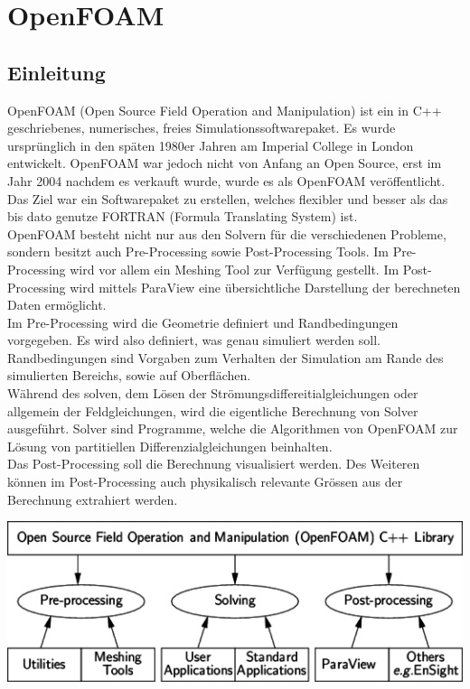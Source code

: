 
\chapter{OpenFOAM}
\begin{refsection}

\newpage
\section{Einleitung}
OpenFOAM (Open Source Field Operation and Manipulation) ist ein in C++ geschriebenes, numerisches, freies Simulationssoftwarepaket. Es wurde ursprünglich in den späten 1980er Jahren am Imperial College in London entwickelt. OpenFOAM war jedoch nicht von Anfang an Open Source, erst im Jahr 2004 nachdem es verkauft wurde, wurde es als OpenFOAM veröffentlicht. Das Ziel war ein Softwarepaket zu erstellen, welches flexibler und besser als das bis dato genutze FORTRAN (Formula Translating System) ist.\\
OpenFOAM besteht nicht nur aus den Solvern für die verschiedenen Probleme, sondern besitzt auch Pre-Processing sowie Post-Processing Tools. Im Pre-Processing wird vor allem ein Meshing Tool zur Verfügung gestellt. Im Post-Processing wird mittels ParaView eine übersichtliche Darstellung der berechneten Daten ermöglicht. \cite{wiki} 
\\
Im Pre-Processing wird die Geometrie definiert und Randbedingungen vorgegeben. Es wird also definiert, was genau simuliert werden soll. Randbedingungen sind Vorgaben zum Verhalten der Simulation am Rande des simulierten Bereichs, sowie auf Oberflächen. \\
Während des solven, dem Lösen der Strömungsdiffereitialgleichungen oder allgemein der Feldgleichungen, wird die eigentliche Berechnung von Solver ausgeführt. Solver sind Programme, welche die Algorithmen von OpenFOAM zur Lösung von partitiellen Differenzialgleichungen beinhalten.  \\
Das Post-Processing soll die Berechnung visualisiert werden. Des Weiteren können im Post-Processing auch physikalisch relevante Grössen aus der Berechnung extrahiert werden. \\
\begin{minipage}{\linewidth}
\includegraphics[width = 0.65 \linewidth]{./OpenFOAM/Pics/Aufbau.png}
\end{minipage}

\end{refsection}

